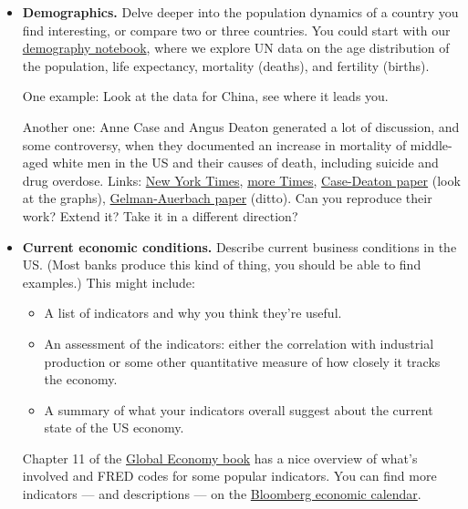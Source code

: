 \documentclass[11pt]{article}
\begin{document}
\begin{itemize}
\item {\bf Demographics.\/} Delve deeper into the population dynamics of a country
you find interesting, or compare two or three countries.
You could start with our
\href{https://github.com/DaveBackus/Data_Bootcamp/blob/master/Code/Lab/UN_demography.ipynb}
{demography notebook},
where we explore UN data on
the age distribution of the population, life expectancy, mortality (deaths), and fertility (births).

One example:  Look at the data for China, see where it leads you.

Another one:  Anne Case and Angus Deaton generated a lot of discussion,
and some controversy, when they documented an increase in mortality of middle-aged white men in the US
and their causes of death, including suicide and drug overdose.
Links:
\href{http://www.nytimes.com/2015/11/03/health/death-rates-rising-for-middle-aged-white-americans-study-finds.html}
    {New York Times},
\href{http://www.nytimes.com/2015/11/07/upshot/more-details-on-rising-mortality-among-middle-aged-whites.html}
    {more Times},
\href{http://www.pnas.org/content/112/49/15078.full.pdf}{Case-Deaton paper} (look at the graphs),
\href{http://andrewgelman.com/wp-content/uploads/2017/04/ageadj.pdf}{Gelman-Auerbach paper} (ditto).
Can you reproduce their work?  Extend it?  Take it in a different direction?

\item {\bf Current economic conditions.\/}  Describe current business conditions in the US.
(Most banks produce this kind of thing, you should be able to find examples.)
This might include:
\begin{itemize}
\item A list of indicators and why you think they're useful.
\item An assessment of the indicators:  either the correlation with industrial production
or some other quantitative measure of how closely it tracks the economy.
\item A summary of what your indicators overall suggest about the current state
of the US economy.
\end{itemize}
Chapter 11 of the \href{(http://www.stern.nyu.edu/experience-stern/about/departments-centers-initiatives/centers-of-research/global-economy-business/development-initiatives/global-economy-course}
{Global Economy book} has a nice overview of what's involved
and FRED codes for some popular indicators.
You can find more indicators --- and descriptions ---
on the
\href{http://www.bloomberg.com/markets/economic-calendar}{Bloomberg economic calendar}.


\end{itemize}
\end{document}
